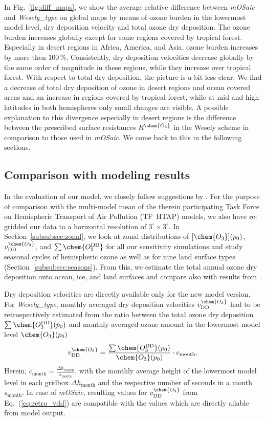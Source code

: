 \documentclass[gmd, manuscript]{copernicus}
\begin{document}
%
In Fig.~\ref{fig:diff_maps}, we show the average relative difference between \emph{mOSaic} and \emph{Wesely\_type} on global maps by means of ozone burden in the lowermost model level, dry deposition velocity and total ozone dry deposition. The ozone burden increases globally except for some regions covered by tropical forest. Especially in desert regions in Africa, America, and Asia, ozone burden increases by more then $100\,\unit{\%}$. Consistently, dry deposition velocities decrease globally by the same order of magnitude in these regions, while they increase over tropical forest. With respect to total dry deposition, the picture is a bit less clear. We find a decrease of total dry deposition of ozone in desert regions and ocean covered areas and an increase in regions covered by tropical forest, while at mid and high latitudes in both hemispheres only small changes are visible. A possible explanation to this divergence especially in desert regions is the difference between the prescribed surface resistances $R^\chem{O_3}$ in the Wesely scheme in comparison to those used in \emph{mOSaic}. We come back to this in the following sections.

\subsection{Comparison with modeling results}
\label{subsec:model}
%
In the evaluation of our model, we closely follow suggestions by \citet{ACP:Hardacre2015}. For the purpose of comparison with the multi-model mean of the therein participating Task Force on Hemispheric Transport of Air Pollution (TF~HTAP) models, we also have re-gridded our data to a horizontal resolution of $3^\circ\times 3^\circ$. In Section~\ref{subsubsec:zonal}, we look at zonal distributions of $[\chem{O_3}](p_0)$, $v^\chem{O_3}_\text{DD}$, and $\sum\chem{O_3^\text{DD}}$ for all our sensitivity simulations and study seasonal cycles of hemispheric ozone as well as for nine land surface types (Section~\ref{subsubsec:seasons}). From this, we estimate the total annual ozone dry deposition onto ocean, ice, and land surfaces and compare also with results from \citet{ACP:Luhar2017}.

Dry deposition velocities are directly available only for the new model version. For \emph{Wesely\_type}, monthly averaged dry deposition velocities $v^\chem{O_3}_\text{DD}$ had to be retrospectively estimated from the ratio between the total ozone dry deposition $\sum \chem{O_3^\text{DD}}(p_0)$ and monthly averaged ozone amount in the lowermost model level $\chem{O_3}(p_0)$ 
\begin{equation}
  v^\chem{O_3}_\text{DD} = \frac{\sum \chem{O_3^\text{DD}}(p_0)}{\chem{O_3}(p_0)}\cdot c_\text{month}.
  \label{eq:retro_vdd}
\end{equation}
Herein, $c_\text{month} = \frac{\Delta h_\text{month}}{s_\text{month}}$, with the monthly average height of the lowermost model level in each gridbox $\Delta h_\text{month}$ and the respective number of seconds in a month $s_\text{month}$. In case of \emph{mOSaic}, resulting values for $v^\chem{O_3}_\text{DD}$ from Eq.~(\ref{eq:retro_vdd}) are compatible with the values which are directly ailable from model output.
%
\end{document}
